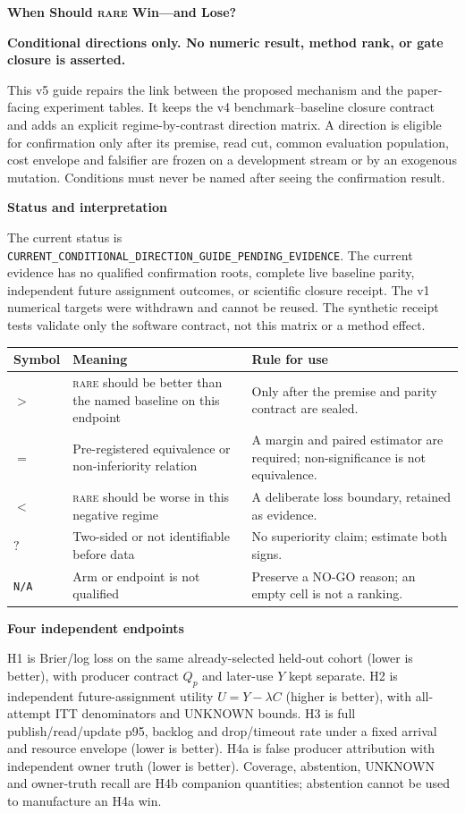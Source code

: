 \documentclass[10pt,a4paper]{article}
\newcommand{\rare}{\textsc{rare}}
\newcommand{\lead}[1]{\vspace{3pt}\textbf{#1}\par}
\newcommand{\caution}{\textcolor{red!70!black}{\textbf{Conditional directions only. No numeric result, method rank, or gate closure is asserted.}}\par}
\begin{document}
{\Large\bfseries When Should \rare{} Win---and Lose?}\par
\caution
This v5 guide repairs the link between the proposed mechanism and the paper-facing
experiment tables. It keeps the v4 benchmark--baseline closure contract and adds an
explicit regime-by-contrast direction matrix. A direction is eligible for confirmation
only after its premise, read cut, common evaluation population, cost envelope and
falsifier are frozen on a development stream or by an exogenous mutation. Conditions
must never be named after seeing the confirmation result.

\lead{Status and interpretation}
The current status is \texttt{CURRENT\_CONDITIONAL\_DIRECTION\_GUIDE\_PENDING\_EVIDENCE}.
The current evidence has no qualified confirmation roots, complete live baseline parity,
independent future assignment outcomes, or scientific closure receipt. The v1 numerical
targets were withdrawn and cannot be reused. The synthetic receipt tests validate only
the software contract, not this matrix or a method effect.

\begin{center}\small
\begin{tabularx}{\linewidth}{@{}L{.14\linewidth}X L{.22\linewidth}@{}}\toprule
Symbol & Meaning & Rule for use\\\midrule
$>$ & \rare{} should be better than the named baseline on this endpoint & Only after the premise and parity contract are sealed.\\
$=$ & Pre-registered equivalence or non-inferiority relation & A margin and paired estimator are required; non-significance is not equivalence.\\
$<$ & \rare{} should be worse in this negative regime & A deliberate loss boundary, retained as evidence.\\
$?$ & Two-sided or not identifiable before data & No superiority claim; estimate both signs.\\
\texttt{N/A} & Arm or endpoint is not qualified & Preserve a NO-GO reason; an empty cell is not a ranking.\\\bottomrule
\end{tabularx}\end{center}

\lead{Four independent endpoints}
H1 is Brier/log loss on the same already-selected held-out cohort (lower is better),
with producer contract $Q_p$ and later-use $Y$ kept separate. H2 is independent
future-assignment utility $U=Y-\lambda C$ (higher is better), with all-attempt ITT
denominators and UNKNOWN bounds. H3 is full publish/read/update p95, backlog and
drop/timeout rate under a fixed arrival and resource envelope (lower is better).
H4a is false producer attribution with independent owner truth (lower is better).
Coverage, abstention, UNKNOWN and owner-truth recall are H4b companion quantities;
abstention cannot be used to manufacture an H4a win.
\end{document}
